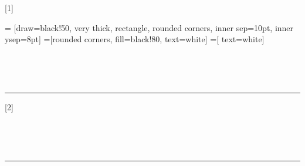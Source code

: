 [1]{%
   = [draw=black!50, very thick, rectangle, rounded
  corners, inner sep=10pt, inner ysep=8pt] %
   =[rounded corners, fill=black!80,
  text=white] %
   =[ text=white]
  \begin{center}
  \end{center}
}

{ %
  ~\\[-1.8cm]
  \begin{center}
    \bf \LARGE \BODY
  \end{center}
  ~\\[-.6cm]
  \hrule %
  \vspace*{.2cm}
} %

[2] %
{ %
  ~\\[-#1cm]
  \begin{center}
    \bf \LARGE \BODY
  \end{center}
  ~\\[-#2cm]
  \hrule %
  \vspace*{.2cm}
} %


